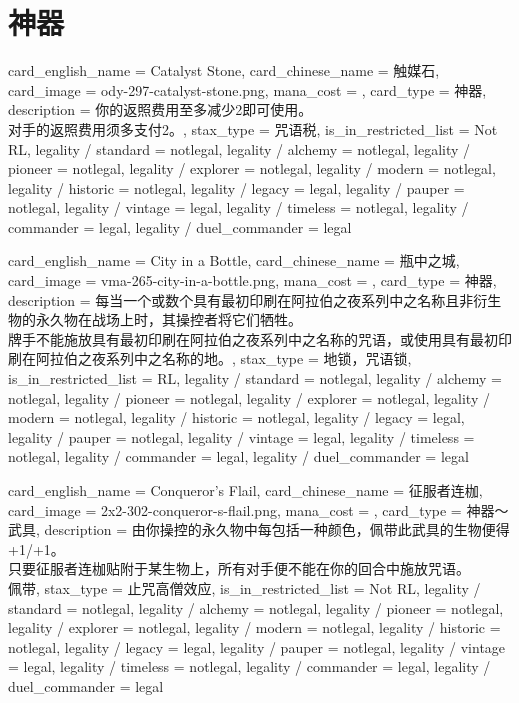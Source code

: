 \documentclass[lang = cn, color = black, 10pt]{AllThatStax}
\begin{document}
\section{神器}

\card
{
	card_english_name = {Catalyst Stone},
	card_chinese_name = {触媒石},
	card_image = ody-297-catalyst-stone.png,
	mana_cost = ,
	card_type = 神器,
	description = {你的返照费用至多减少2即可使用。\\
对手的返照费用须多支付2。},
	stax_type = 咒语税,
	is_in_restricted_list = Not RL,
	legality / standard = notlegal,
	legality / alchemy = notlegal,
	legality / pioneer = notlegal,
	legality / explorer = notlegal,
	legality / modern = notlegal,
	legality / historic = notlegal,
	legality / legacy = legal,
	legality / pauper = notlegal,
	legality / vintage = legal,
	legality / timeless = notlegal,
	legality / commander = legal,
	legality / duel_commander = legal
}

\card
{
	card_english_name = {City in a Bottle},
	card_chinese_name = {瓶中之城},
	card_image = vma-265-city-in-a-bottle.png,
	mana_cost = ,
	card_type = 神器,
	description = {每当一个或数个具有最初印刷在阿拉伯之夜系列中之名称且非衍生物的永久物在战场上时，其操控者将它们牺牲。\\
牌手不能施放具有最初印刷在阿拉伯之夜系列中之名称的咒语，或使用具有最初印刷在阿拉伯之夜系列中之名称的地。},
	stax_type = 地锁，咒语锁,
	is_in_restricted_list = RL,
	legality / standard = notlegal,
	legality / alchemy = notlegal,
	legality / pioneer = notlegal,
	legality / explorer = notlegal,
	legality / modern = notlegal,
	legality / historic = notlegal,
	legality / legacy = legal,
	legality / pauper = notlegal,
	legality / vintage = legal,
	legality / timeless = notlegal,
	legality / commander = legal,
	legality / duel_commander = legal
}

\card
{
	card_english_name = {Conqueror's Flail},
	card_chinese_name = {征服者连枷},
	card_image = 2x2-302-conqueror-s-flail.png,
	mana_cost = ,
	card_type = 神器～武具,
	description = {由你操控的永久物中每包括一种颜色，佩带此武具的生物便得+1/+1。\\
只要征服者连枷贴附于某生物上，所有对手便不能在你的回合中施放咒语。\\
佩带},
	stax_type = 止咒高僧效应,
	is_in_restricted_list = Not RL,
	legality / standard = notlegal,
	legality / alchemy = notlegal,
	legality / pioneer = notlegal,
	legality / explorer = notlegal,
	legality / modern = notlegal,
	legality / historic = notlegal,
	legality / legacy = legal,
	legality / pauper = notlegal,
	legality / vintage = legal,
	legality / timeless = notlegal,
	legality / commander = legal,
	legality / duel_commander = legal
}
\end{document}

